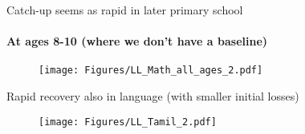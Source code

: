 \documentclass[aspectratio=169,numbering=none]{beamer}
\begin{document}
\begin{frame}[plain]{Catch-up seems as rapid in later primary school}
\framesubtitle{At ages 8-10 (where we don't have a baseline)}
\begin{figure}[H]
\begin{center}
\texttt{[image: Figures/LL\_Math\_all\_ages\_2.pdf]} 
\end{center}
\end{figure}
\end{frame}


\begin{frame}[plain]{Rapid recovery also in language (with smaller initial losses)}
\begin{figure}[H]
\begin{center}
\texttt{[image: Figures/LL\_Tamil\_2.pdf]} 
\end{center}
\end{figure}
\end{frame}
\end{document}
